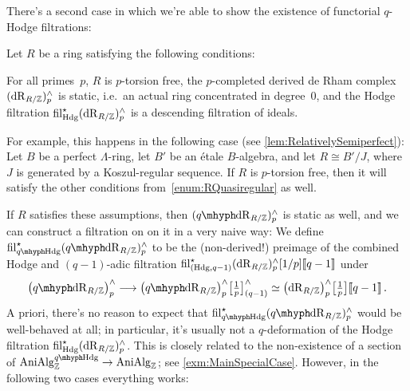 \documentclass[DIV=12,numbers=enddot,leqno,bibliography=totoc]{scrartcl}
\begin{document}
	There's a second case in which we're able to show the existence of functorial $q$-Hodge filtrations:
	
	\begin{numpar}\label{par:CanonicalqHodgeQuasiregular}
		Let $R$ be a ring satisfying the following conditions:
		\begin{alphanumerate}\itshape
			\item[R] For all primes~$p$, $R$ is $p$-torsion free, the $p$-completed derived de Rham complex $(\mathrm{dR}_{R/\mathbb{Z}})_p^\wedge$ is static, i.e.\ an actual ring concentrated in degree~$0$, and the Hodge filtration $\operatorname{fil}_{\mathrm{Hdg}}^\star(\mathrm{dR}_{R/\mathbb{Z}})_p^\wedge$ is a descending filtration of ideals.\label{enum:RQuasiregular}
		\end{alphanumerate}
		For example, this happens in the following case (see \cref{lem:RelativelySemiperfect}): Let $B$ be a perfect $\Lambda$-ring, let $B'$ be an étale $B$-algebra, and let $R\cong B'/J$, where $J$ is generated by a Koszul-regular sequence. If $R$ is $p$-torsion free, then it will satisfy the other conditions from~\cref{enum:RQuasiregular} as well.
		
		If $R$ satisfies these assumptions, then $(\qdeRham_{R/\IZ})_p^\complete$ is static as well, and we can construct a filtration on on it in a very naive way: We define $\fil_{\qHodge}^\star(\qdeRham_{R/\IZ})_p^\complete$ to be the (non-derived!) preimage of the combined Hodge and $(q-1)$-adic filtration $\operatorname{fil}_{(\mathrm{Hdg},q-1)}^\star(\mathrm{dR}_{R/\mathbb{Z}})_p^\wedge[1/p]\llbracket q-1\rrbracket$ under
		\begin{equation*}
			\bigl(\qdeRham_{R/\IZ}\bigr)_p^\complete\longrightarrow\bigl(\qdeRham_{R/\IZ}\bigr)_p^\complete\bigl[\localise{p}\bigr]_{(q-1)}^\complete\simeq \bigl(\deRham_{R/\IZ}\bigr)_p^\complete\bigl[\localise{p}\bigr]\qpower\,.
		\end{equation*}
		A priori, there's no reason to expect that $\fil_{\qHodge}^\star(\qdeRham_{R/\IZ})_p^\complete$ would be well-behaved at all; in particular, it's usually not a $q$-deformation of the Hodge filtration $\operatorname{fil}_{\mathrm{Hdg}}^\star(\mathrm{dR}_{R/\mathbb{Z}})_p^\wedge$. This is closely related to the non-existence of a section of $\cat{AniAlg}_\IZ^{\qHodge}\rightarrow \cat{AniAlg}_\IZ$; see \cref{exm:MainSpecialCase}. However, in the following two cases everything works:
	\end{numpar}
\end{document}
